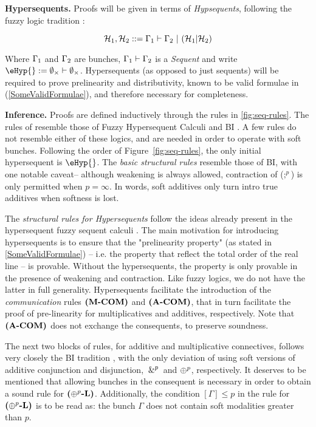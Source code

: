 \textbf{Hypersequents.}
Proofs will be given in terms of \emph{Hypsequents}, 
following the fuzzy logic tradition \citep{prooffuzzy}: 

$$\mathcal{H}_1, \mathcal{H}_2 ::= \Gamma_1 \vdash  \Gamma_2 \ | \
(\mathcal{H}_1 | \mathcal{H}_2)
$$

Where $\Gamma_1$ and $\Gamma_2$ are bunches, $\Gamma_1 \vdash  \Gamma_2$ is a \emph{Sequent} and write $ \eHyp{} := \sequentPDL{\emptyset{}_{\times}}{\emptyset{}_{\times}}$. Hypersequents (as opposed to just sequents) will be required to prove prelinearity and distributivity, known to be valid formulae in \OL{} (\cref{SomeValidFormulae}), and therefore necessary for completeness. 

\textbf{Inference.} Proofs are defined inductively through the rules in \cref{fig:seq-rules}. The rules of \OL{} resemble those of Fuzzy Hypersequent Calculi \citep{prooffuzzy} and BI \citep{o1999logic}.  A few rules do not resemble either of these logics, and are needed in order to operate with soft bunches.  Following the order of Figure~\ref{fig:seq-rules}, the only initial hypersequent is $\eHyp{}$. The \emph{basic structural rules} resemble those of BI, with one notable caveat-- although weakening is always allowed, contraction of ($;^{p}$) is only permitted when $p = \infty$. In words, soft additives only turn intro true additives when softness is lost. 

The \emph{structural rules for Hypersequents} follow the ideas already present in the hypersequent fuzzy sequent calculi \citep{prooffuzzy}. The main motivation for introducing hypersequents is to ensure that the "prelinearity property" (as stated in \cref{SomeValidFormulae}) -- i.e. the property that reflect the total order of the real line --  is provable. Without the hypersequents, the property is only provable in the presence of weakening and contraction. Like fuzzy logics, we do not have the latter in full generality. Hypersequents facilitate the introduction of the \emph{communication} rules ${\normalfont \textbf{(M-COM)}}$ and ${\normalfont \textbf{(A-COM)}}$, that in turn facilitate the proof of pre-linearity for multiplicatives and additives, respectively. Note that ${\normalfont \textbf{(A-COM)}}$ does not exchange the consequents, to preserve soundness. 

The next two blocks of rules, for additive and multiplicative connectives, follows very closely the BI tradition \citep{o1999logic, 10.1145/3497775.3503690}, with the only deviation of using soft versions of additive conjunction and disjunction, $\,\&^{p}\,$ and $\oplus^{p}$, respectively. It deserves to be mentioned that allowing bunches in the consequent is necessary in order to obtain a sound rule for ${\normalfont \textbf{($\oplus^{p}$-L)}}$. Additionally, the condition $[\Gamma] \leq p$ in the rule for  ${\normalfont \textbf{($\oplus^{p}$-L)}}$ is to be read as: the bunch $\Gamma$ does not contain soft modalities greater than $p$.

